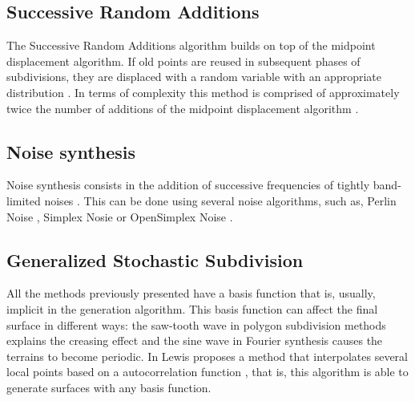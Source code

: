\subsection{Successive Random Additions}

The Successive Random Additions algorithm \cite{Saupe1988} builds on top of the midpoint displacement algorithm. If old points are reused in subsequent phases of subdivisions, they are displaced with a random variable with an appropriate distribution \cite{Musgrave1989}. In terms of complexity this method is comprised of approximately twice the number of additions of the midpoint displacement algorithm \cite{Voss1985}.

\subsection{Noise synthesis}

Noise synthesis consists in the addition of successive frequencies of tightly band-limited noises \cite{Musgrave1989}. This can be done using several noise algorithms, such as, Perlin Noise \cite{Perlin1985}, Simplex Nosie \cite{Perlin2002} or OpenSimplex Noise \cite{Spencer2015}.

\subsection{Generalized Stochastic Subdivision}

All the methods previously presented have a basis function that is, usually, implicit in the generation algorithm. This basis function can affect the final surface in different ways: the saw-tooth wave in polygon subdivision methods explains the creasing effect and the sine wave in Fourier synthesis causes the terrains to become periodic. In \cite{Lewis1987} Lewis proposes a method that interpolates several local points based on a autocorrelation function \cite{Musgrave1993}, that is, this algorithm is able to generate surfaces with any basis function.



